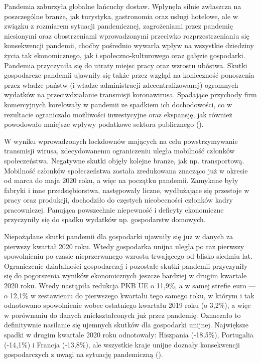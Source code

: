 \documentclass[polish, twoside, 12pt, a4paper]{article}
\theoremstyle{definition}
\theoremstyle{plain}
\theoremstyle{remark}
\begin{document}
Pandemia zaburzyła globalne łańcuchy dostaw. Wpłynęła silnie zwłaszcza na poszczególne branże, jak turystyka, gastronomia oraz usługi hotelowe, ale w związku z rozmiarem sytuacji pandemicznej, zagrożeniami przez pandemię niesionymi oraz obostrzeniami wprowadzonymi przeciwko rozprzestrzenianiu się konsekwencji pandemii, choćby pośrednio wywarła wpływ na wszystkie dziedziny życia tak ekonomicznego, jak i społeczno-kulturowego oraz gałęzie gospodarki. Pandemia przyczyniła się do utraty miejsc pracy oraz wzrostu ubóstwa. Skutki gospodarcze pandemii ujawniły się także przez wzgląd na konieczność ponoszenia przez władze państw (i władze administracji zdecentralizowanej) ogromnych wydatków na przeciwdziałanie transmisji koronawirusa. Spadające przychody firm komercyjnych korelowały w pandemii ze spadkiem ich dochodowości, co w rezultacie ograniczało możliwości inwestycyjne oraz ekspansję, jak również powodowało mniejsze wpływy podatkowe sektora publicznego (\cite{dziembala2021}).  

W wyniku wprowadzonych lockdownów mających na celu powstrzymywanie transmisji wirusa, zdecydowanemu ograniczeniu uległa mobilność członków społeczeństwa. Negatywne skutki objęły kolejne branże, jak np. transportową. Mobilność członków społeczeństwa została zredukowana znacząco już w okresie od marca do maja 2020 roku, a więc na początku pandemii. Zamykane były fabryki i inne przedsiębiorstwa, następowały liczne, wydłużające się przestoje w pracy oraz produkcji, dochodziło do częstych nieobecności członków kadry pracowniczej. Panująca powszechnie niepewność i deficyty ekonomiczne przyczyniły się do spadku wydatków np. gospodarstw domowych. 

Niepożądane skutki pandemii dla gospodarki ujawniły się już w danych za pierwszy kwartał 2020 roku. Wtedy gospodarka unijna uległa po raz pierwszy spowolnieniu po czasie nieprzerwanego wzrostu trwającego od blisko siedmiu lat. Ograniczenie działalności gospodarczej i pozostałe skutki pandemii przyczyniły się do pogorszenia wyników ekonomicznych jeszcze bardziej w drugim kwartale 2020 roku. Wtedy nastąpiła redukcja PKB UE o 11,9\%, a w samej strefie euro --- o 12,1\% w zestawieniu do pierwszego kwartału tego samego roku, w którym i tak odnotowano spowolnienie wobec ostatniego kwartału 2019 roku (o 3,2\%), a więc w porównaniu do danych zniekształconych już przez pandemię. Oznaczało to definitywnie nasilanie się ujemnych skutków dla gospodarki unijnej. Największe spadki w drugim kwartale 2020 roku odnotowały: Hiszpania (-18,5\%), Portugalia (-14,1\%) i Francja (-13,8\%), ale wszystkie kraje unijne doznały konsekwencji gospodarczych z uwagi na sytuację pandemiczną (\cite{dziembala2021}). 
\end{document}
